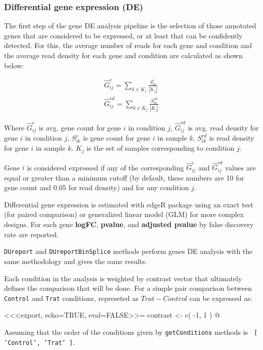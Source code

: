 \documentclass{article}
\begin{document}
\subsubsection{ Differential gene expression (DE)}
\label{sec:de}

The first step of the gene DE analysis pipeline is the selection of those
annotated genes that are considered to be expressed, or at least that can be
confidently detected. For this, the average number of reads for each gene
and condition and the average read density for each gene and condition are
calculated as shown below:

\begin{eqnarray*}
   \hat G^{c}_{ij} = \sum_{k \in K_j} \frac{ S^{c}_{ik} }{ |K_j| } \\
   \hat G^{rd}_{ij} = \sum_{k \in K_j} \frac{ S^{rd}_{ik} }{ |K_j| }
   \label{eq:genByCond}
\end{eqnarray*}

Where $\hat G^{c}_{ij}$ is avg. gene count for gene $i$ in condition $j$,
$\hat G^{rd}_{ij}$ is avg. read density for gene $i$ in condition $j$, $S^{c}_{ik}$
is gene count for gene $i$ in sample $k$, $S^{rd}_{ik}$ is read density for
gene $i$ in sample $k$. $K_j$ is the set of samples corresponding to condition $j$.

Gene $i$ is considered expressed if any of the corresponding $\hat G^{c}_{ij}$
and $\hat G^{rd}_{ij}$ values are equal or greater than a minimum cutoff (by 
default, these numbers are 10 for gene count and 0.05 for read density) and for
any condition $j$.

Differential gene expression is estimated with edgeR \cite{Robinson2012} 
package using an exact test (for paired comparison) or generalized linear model
(GLM) for more complex designs. For each gene \textbf{logFC}, \textbf{pvalue},
and \textbf{adjusted  pvalue} by false discovery rate \cite{fdr} are reported. 

\texttt{DUreport} and \texttt{DUreportBinSplice} methods perform genes DE
analysis with the same methodology and gives the same results. 

Each condition in the analysis is weighted by contrast vector that ultimately
defines the comparison that will be done. For a simple pair comparison between
\texttt{Control} and \texttt{Trat} conditions, represeted as $Trat - Control$ 
can be expressed as:

<<<export, echo=TRUE, eval=FALSE>>=
contrast <- c( -1, 1 ) 
@

Assuming that the order of the conditions given by \texttt{getConditions}
methods is \texttt{ [ 'Control', 'Trat' ]}. 
\end{document}
